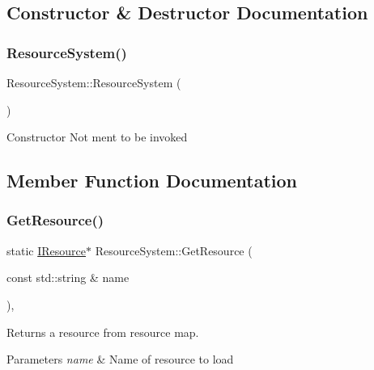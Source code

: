 \subsection{Constructor \& Destructor Documentation}
\mbox{\label{class_resource_system_a635cbc11ec235e902cfd689371a3abec}} 
\subsubsection{\texorpdfstring{Resource\+System()}{ResourceSystem()}}
{\footnotesize\ttfamily Resource\+System\+::\+Resource\+System (\begin{DoxyParamCaption}{ }\end{DoxyParamCaption})\hspace{0.3cm}{\ttfamily [delete]}}

Constructor Not ment to be invoked 

\subsection{Member Function Documentation}
\mbox{\label{class_resource_system_a6cdcecb56a3f7131836b16d2afd10aa7}} 
\subsubsection{\texorpdfstring{Get\+Resource()}{GetResource()}}
{\footnotesize\ttfamily static \mbox{\hyperlink{class_i_resource}{I\+Resource}}$\ast$ Resource\+System\+::\+Get\+Resource (\begin{DoxyParamCaption}\item[{const std\+::string \&}]{name }\end{DoxyParamCaption})\hspace{0.3cm}{\ttfamily [inline]}, {\ttfamily [static]}}



Returns a resource from resource map. 


\begin{DoxyParams}{Parameters}
{\em name} & Name of resource to load \\
\hline
\end{DoxyParams}
\mbox{\label{class_resource_system_ac4a4f93f639f85ed01f6482343cf22bf}} 
